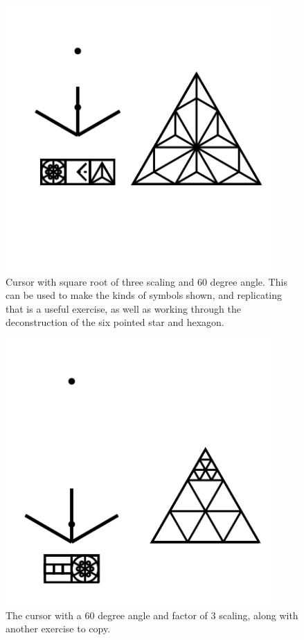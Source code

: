 \begin{figure}
	\centering
	\includegraphics[width=4in]{figures/web2d/cursorroot3.png}
	\caption[cursorroot3]
	{Cursor with square root of three scaling and 60 degree angle.  This can be used to make the kinds of symbols shown, and replicating that is a useful exercise, as well as working through the deconstruction of the six pointed star and hexagon.}
\end{figure}
\begin{figure}
	\centering
	\includegraphics[width=4in]{figures/web2d/cursor3.png}
	\caption[cursor3]
	{The cursor with a 60 degree angle and factor of 3 scaling, along with another exercise to copy.}
\end{figure}
